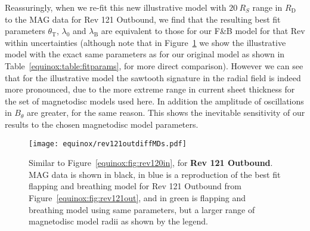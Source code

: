 Reassuringly, when we re-fit this new illustrative model with $\SI{20}{R_S}$ range in $R_\mathrm{D}$ to the MAG data for Rev 121 Outbound, we find that the resulting best fit parameters $\theta_\mathrm{T}$, $\lambda_0$ and $\lambda_\mathrm{B}$ are equivalent to those for our F{\&}B model for that Rev within uncertainties (although note that in Figure~\ref{equinox:fig:rev121outdiffMDs} we show the illustrative model with the exact same parameters as for our original model as shown in Table~\ref{equinox:table:fitparams}, for more direct comparison). However we can see that for the illustrative model the sawtooth signature in the radial field is indeed more pronounced, due to the more extreme range in current sheet thickness for the set of magnetodisc models used here. In addition the amplitude of oscillations in $B_{\theta}$ are greater, for the same reason. This shows the inevitable sensitivity of our results to the chosen magnetodisc model parameters.
\begin{figure}
\centering
\texttt{[image: equinox/rev121outdiffMDs.pdf]}
\caption[\textit{Cassini} MAG data, FO and F{\&}B model predictions for Rev 121 Outbound, with modified F{\&}B model parameters.]{Similar to Figure~\ref{equinox:fig:rev120in}, for \textbf{Rev 121 Outbound}. MAG data is shown in black, in blue is a reproduction of the best fit flapping and breathing model for Rev 121 Outbound from Figure~\ref{equinox:fig:rev121out}, and in green is flapping and breathing model using same parameters, but a larger range of magnetodisc model radii as shown by the legend.}
\label{equinox:fig:rev121outdiffMDs}
\end{figure}

